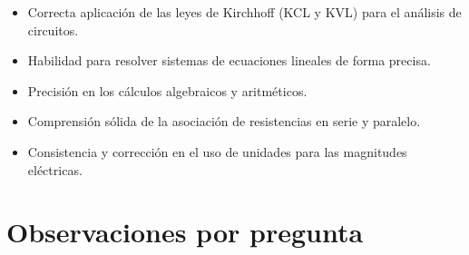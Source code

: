 \documentclass[11pt,a4paper]{article}
\begin{document}
\vspace{4pt}
\begin{minipage}[t]{0.48\linewidth}
  \begin{tcolorbox}[cajaFortaleza, title={Fortalezas}]
\begin{itemize}[leftmargin=1.5em, itemsep=2pt]
  \item Correcta aplicación de las leyes de Kirchhoff (KCL y KVL) para el análisis de circuitos.
  \item Habilidad para resolver sistemas de ecuaciones lineales de forma precisa.
  \item Precisión en los cálculos algebraicos y aritméticos.
  \item Comprensión sólida de la asociación de resistencias en serie y paralelo.
\end{itemize}
  \end{tcolorbox}
\end{minipage}
\hfill
\begin{minipage}[t]{0.48\linewidth}
  \begin{tcolorbox}[cajaMejora, title={Areas de mejora}]
\begin{itemize}[leftmargin=1.5em, itemsep=2pt]
  \item Consistencia y corrección en el uso de unidades para las magnitudes eléctricas.
\end{itemize}
  \end{tcolorbox}
\end{minipage}

\section*{Observaciones por pregunta}
\end{document}
